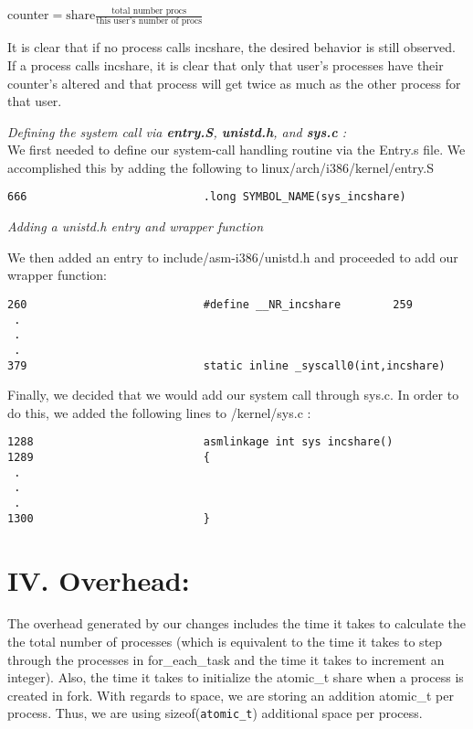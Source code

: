 \documentclass[10pt]{article}
\begin{document}
counter$ = \text{share}\frac{\text{total number procs}}{\text{this user's number of procs}}$

It is clear that if no process calls incshare, the desired behavior is still observed. If a process calls incshare, it is clear that only that user's processes have their counter's altered and that process will get twice as much as the other process for that user.

{\textit{Defining the system call via \textbf{entry.S}, \textbf{unistd.h}, and \textbf{sys.c} :}} \\

We first needed to define our system-call handling routine via the Entry.s file. We accomplished this by adding the following to linux/arch/i386/kernel/entry.S \\

\begin{verbatim}
666                           .long SYMBOL_NAME(sys_incshare)
\end{verbatim}

{\textit{Adding a unistd.h entry and wrapper function}}

We then added an entry to include/asm-i386/unistd.h and proceeded to add our wrapper function:
\begin{verbatim}
260                           #define __NR_incshare        259
 .
 .
 .
379                           static inline _syscall0(int,incshare)
\end{verbatim}

Finally, we decided that we would add our system call through sys.c. In order to do this, we added the following lines to /kernel/sys.c :
\begin{verbatim}
1288                          asmlinkage int sys incshare()
1289                          {
 .
 .
 .
1300                          }
\end{verbatim}

\section{IV. Overhead:}

The overhead generated by our changes includes the time it takes to calculate the the total number of processes (which is equivalent to the time it takes to step through the processes in for\_each\_task and the time it takes to increment an integer). Also, the time it takes to initialize the atomic\_t share when a process is created in fork. With regards to space, we are storing an addition atomic\_t per process. Thus, we are using sizeof(\texttt{atomic\_t}) additional space per process.
\end{document}
